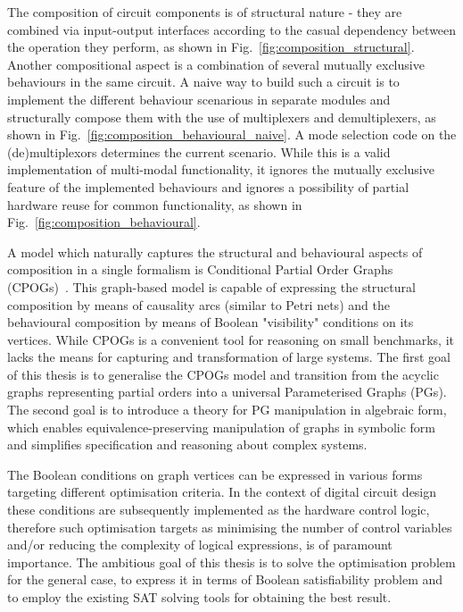 The composition of circuit components is of structural nature - they are combined via input-output interfaces according to the casual dependency between the operation they perform, as shown in Fig.~\ref{fig:composition_structural}.
Another compositional aspect is a combination of several mutually exclusive behaviours in the same circuit. A naive way to build such a circuit is to implement the different behaviour scenarious in separate modules and structurally compose them with the use of multiplexers and demultiplexers, as shown in Fig.~\ref{fig:composition_behavioural_naive}. A mode selection code on the (de)multiplexors determines the current scenario.  While this is a valid implementation of multi-modal functionality, it ignores the mutually exclusive feature of the implemented behaviours and ignores a possibility of partial hardware reuse for common functionality, as shown in Fig.~\ref{fig:composition_behavioural}.

A model which naturally captures the structural and behavioural aspects of composition in a single formalism is Conditional Partial Order Graphs (CPOGs)~\cite{2009_mokhov_phd}. This graph-based model is capable of expressing the structural composition by means of causality arcs (similar to Petri nets) and the behavioural composition by means of Boolean "visibility" conditions on its vertices. While CPOGs is a convenient tool for reasoning on small benchmarks, it lacks the means for capturing and transformation of large systems. The first  goal of this thesis is to generalise the CPOGs model and transition from the acyclic graphs representing partial orders into a universal Parameterised Graphs (PGs). The second goal is to introduce a theory for PG manipulation in algebraic form, which enables equivalence-preserving manipulation of graphs in symbolic form and simplifies specification and reasoning about complex systems.

The Boolean conditions on graph vertices can be expressed in various forms targeting different optimisation criteria. In the context of digital circuit design these conditions are subsequently implemented as the hardware control logic, therefore such optimisation targets as minimising the number of control variables and/or reducing the complexity of logical expressions, is of paramount importance. The ambitious goal of this thesis is to solve the optimisation problem for the general case, to express it in terms of Boolean satisfiability problem and to employ the existing SAT solving tools for obtaining the best result.


